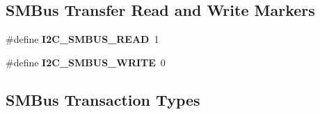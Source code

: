 \subsection*{S\+M\+Bus Transfer Read and Write Markers}
\begin{DoxyCompactItemize}
\item 
\mbox{\label{group__I2CLinux_ga8f5482668eb7741ef21dd9c211d876c9}} 
\#define {\bfseries I2\+C\+\_\+\+S\+M\+B\+U\+S\+\_\+\+R\+E\+AD}~1
\item 
\mbox{\label{group__I2CLinux_gac4d2a9af170b85b33c640c811f240c76}} 
\#define {\bfseries I2\+C\+\_\+\+S\+M\+B\+U\+S\+\_\+\+W\+R\+I\+TE}~0
\end{DoxyCompactItemize}
\subsection*{S\+M\+Bus Transaction Types}
